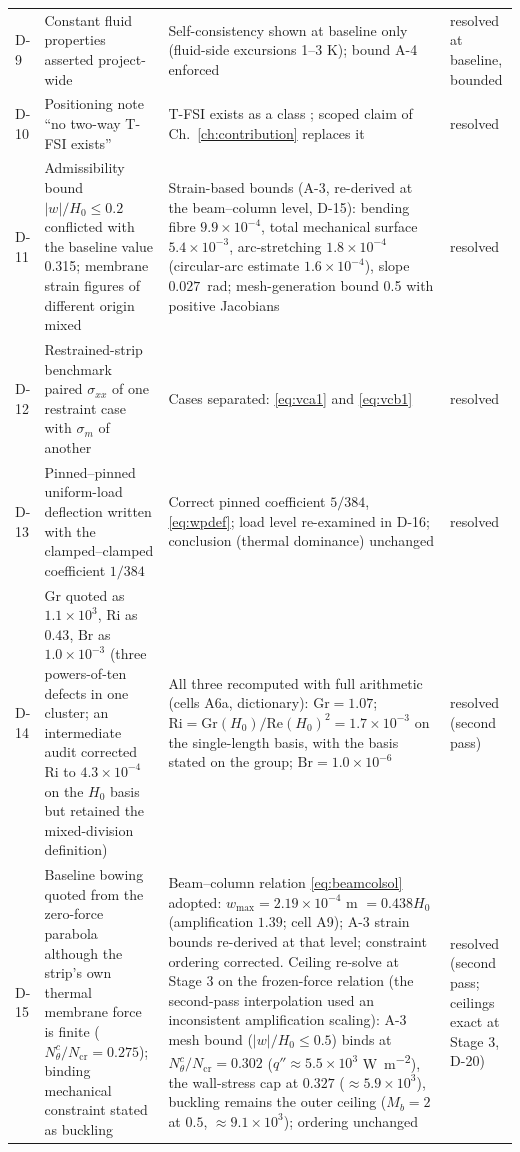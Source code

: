 \begin{longtable}{p{1cm}p{4.6cm}p{5.2cm}p{3.2cm}}
D-9 & Constant fluid properties asserted project-wide & Self-consistency shown at baseline only (fluid-side excursions 1--3 K); bound A-4 enforced & resolved at baseline, bounded \\
D-10 & Positioning note ``no two-way T-FSI exists'' & T-FSI exists as a class \cite{kumar2026thermo,saleh2025laminar}; scoped claim of Ch.~\ref{ch:contribution} replaces it & resolved \\
D-11 & Admissibility bound $|w|/H_0\le0.2$ conflicted with the baseline value 0.315; membrane strain figures of different origin mixed & Strain-based bounds (A-3, re-derived at the beam--column level, D-15): bending fibre $9.9\times10^{-4}$, total mechanical surface $5.4\times10^{-3}$, arc-stretching $1.8\times10^{-4}$ (circular-arc estimate $1.6\times10^{-4}$), slope $0.027$~rad; mesh-generation bound 0.5 with positive Jacobians & resolved \\
D-12 & Restrained-strip benchmark paired $\sigma_{xx}$ of one restraint case with $\sigma_m$ of another & Cases separated: \eqref{eq:vca1} and \eqref{eq:vcb1} & resolved \\
D-13 & Pinned--pinned uniform-load deflection written with the clamped--clamped coefficient $1/384$ & Correct pinned coefficient $5/384$, \eqref{eq:wpdef}; load level re-examined in D-16; conclusion (thermal dominance) unchanged & resolved \\
D-14 & $\mathrm{Gr}$ quoted as $1.1\times10^3$, $\mathrm{Ri}$ as $0.43$, $\mathrm{Br}$ as $1.0\times10^{-3}$ (three powers-of-ten defects in one cluster; an intermediate audit corrected $\mathrm{Ri}$ to $4.3\times10^{-4}$ on the $H_0$ basis but retained the mixed-division definition) & All three recomputed with full arithmetic (cells A6a, dictionary): $\mathrm{Gr}=1.07$; $\mathrm{Ri}=\mathrm{Gr}(H_0)/\mathrm{Re}(H_0)^2=1.7\times10^{-3}$ on the single-length basis, with the basis stated on the group; $\mathrm{Br}=1.0\times10^{-6}$ & resolved (second pass) \\
D-15 & Baseline bowing quoted from the zero-force parabola although the strip's own thermal membrane force is finite ($N_\theta^c/N_{\mathrm{cr}}=0.275$); binding mechanical constraint stated as buckling & Beam--column relation \eqref{eq:beamcolsol} adopted: $w_{\max}=2.19\times10^{-4}$ m $=0.438H_0$ (amplification $1.39$; cell A9); A-3 strain bounds re-derived at that level; constraint ordering corrected. Ceiling re-solve at Stage 3 on the frozen-force relation (the second-pass interpolation used an inconsistent amplification scaling): A-3 mesh bound ($|w|/H_0\le0.5$) binds at $N_\theta^c/N_{\mathrm{cr}}=0.302$ ($q''\approx5.5\times10^3$ \si{\watt\per\square\metre}), the wall-stress cap at $0.327$ ($\approx5.9\times10^3$), buckling remains the outer ceiling ($M_b=2$ at $0.5$, $\approx9.1\times10^3$); ordering unchanged & resolved (second pass; ceilings exact at Stage 3, D-20) \\

\end{longtable}
